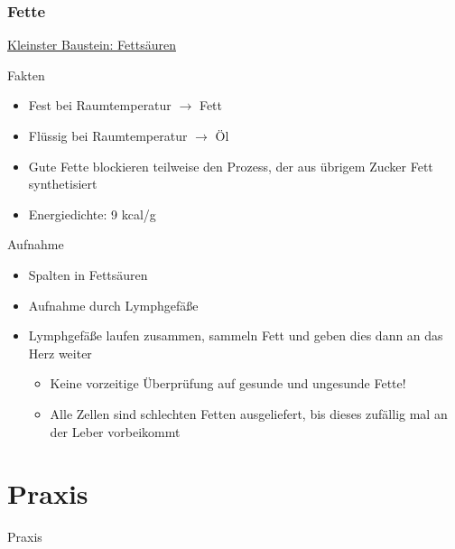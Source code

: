 \documentclass[xcolor=dvipsnames]{beamer}
\begin{document}
    \begin{frame}[allowframebreaks]
        \frametitle{Fette}

        \underline{Kleinster Baustein: Fettsäuren}
        \begin{block}{Fakten}
            \begin{itemize}
                \setlength\itemsep{1em}
                \item Fest bei Raumtemperatur $\rightarrow$ Fett
                \item Flüssig bei Raumtemperatur $\rightarrow$ Öl
                \item Gute Fette blockieren teilweise den Prozess, der aus übrigem Zucker Fett synthetisiert
                \item Energiedichte: 9 kcal/g
            \end{itemize}
        \end{block}

        \framebreak

        \begin{block}{Aufnahme}
            \begin{itemize}
                \setlength\itemsep{1em}
                \item Spalten in Fettsäuren
                \item Aufnahme durch Lymphgefäße
                \item Lymphgefäße laufen zusammen, sammeln Fett und geben dies dann an das Herz weiter
                \begin{itemize}
                    \item Keine vorzeitige Überprüfung auf gesunde und ungesunde Fette!
                    \item Alle Zellen sind schlechten Fetten ausgeliefert, bis dieses zufällig mal an der Leber vorbeikommt
                \end{itemize}
            \end{itemize}
        \end{block}
    \end{frame}

    \section{Praxis}
    {
        \begin{frame}
            \begin{center}
                \Huge Praxis
            \end{center}
        \end{frame}
    }
\end{document}
